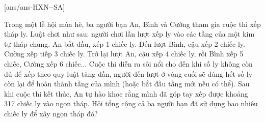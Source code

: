 \caukq
{}[ans/ans-HXN-\sode-SA]
% 
 \begin{ex}%
     Trong một lễ hội mùa hè, ba người bạn An, Bình và Cường tham gia cuộc thi xếp tháp ly. Luật chơi như sau: người chơi lần lượt xếp ly vào các tầng của một kim tự tháp chung. An bắt đầu, xếp 1 chiếc ly. Đến lượt Bình, cậu xếp 2 chiếc ly. Cường xếp tiếp 3 chiếc ly. Trở lại lượt An, cậu xếp 4 chiếc ly, rồi Bình xếp 5 chiếc, Cường xếp 6 chiếc... Cuộc thi diễn ra sôi nổi cho đến khi số ly không còn đủ để xếp theo quy luật tăng dần, người đến lượt ở vòng cuối sẽ dùng hết số ly còn lại để hoàn thành tầng của mình (hoặc bắt đầu tầng mới nếu có thể). Sau khi cuộc thi kết thúc, An tự hào khoe rằng mình đã góp tay xếp được khoảng 317 chiếc ly vào ngọn tháp. Hỏi tổng cộng cả ba người bạn đã sử dụng bao nhiêu chiếc ly để xây ngọn tháp đó?
 \end{ex}
 
